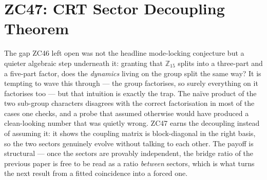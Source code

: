 \documentclass[12pt, a4paper]{article}
\begin{document}
\section{ZC47: CRT Sector Decoupling Theorem}
\label{sec:zc47}

The gap ZC46 left open was not the headline mode-locking conjecture but a
quieter algebraic step underneath it: granting that $\mathbb{Z}_{15}$ splits
into a three-part and a five-part factor, does the \emph{dynamics} living on the
group split the same way? It is tempting to wave this through --- the group
factorises, so surely everything on it factorises too --- but that intuition is
exactly the trap. The naïve product of the two sub-group characters disagrees
with the correct factorisation in most of the cases one checks, and a probe that
assumed otherwise would have produced a clean-looking number that was quietly
wrong. ZC47 earns the decoupling instead of assuming it: it shows the coupling
matrix is block-diagonal in the right basis, so the two sectors genuinely evolve
without talking to each other. The payoff is structural --- once the sectors are
provably independent, the bridge ratio of the previous paper is free to be read
as a ratio \emph{between} sectors, which is what turns the next result from a
fitted coincidence into a forced one.
\end{document}
